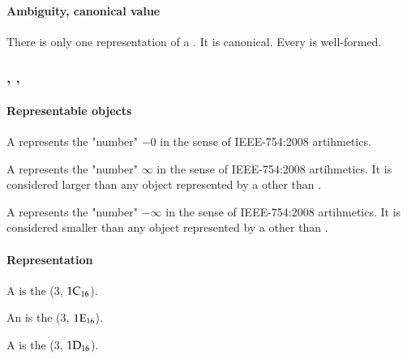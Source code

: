 \paragraph{Ambiguity, canonical value}

There is only one representation of a .
It is canonical.
Every  is well-formed.


\subsubsection{%
    ,
    ,
}
\label{sec:def:MinusZeroValue}
\label{sec:def:InfinityValue}
\label{sec:def:MinusInfinityValue}
\hypertarget{sec:def:MinusZeroValue}{}
\hypertarget{sec:def:InfinityValue}{}
\hypertarget{sec:def:MinusInfinityValue}{}

\paragraph{Representable objects}

A  represents the "number" $-0$ in the sense of IEEE-754:2008 artihmetics.

A  represents the "number" $\infty$ in the sense of IEEE-754:2008 artihmetics.
It is considered larger than any object represented by a 
other than .

A  represents the "number" $-\infty$ in the sense of IEEE-754:2008 artihmetics.
It is considered smaller than any object represented by a 
other than .

\paragraph{Representation}

A  is the ($3$, $\mathrm{1C}_{16}$).

An  is the ($3$, $\mathrm{1E}_{16}$).

A  is the ($3$, $\mathrm{1D}_{16}$).

